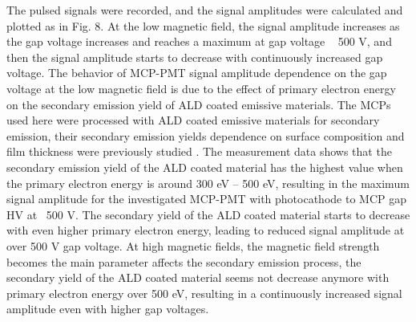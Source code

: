 \documentclass[preprint,5p]{elsarticle}
\begin{document}
The pulsed signals were recorded, and the signal amplitudes were calculated and 
plotted as in Fig. 8. At the low magnetic field, the signal amplitude increases 
as the gap voltage increases and reaches a maximum at gap voltage ~ 500 V, and 
then the signal amplitude starts to decrease with continuously increased gap 
voltage. The behavior of MCP-PMT signal amplitude dependence on the gap voltage 
at the low magnetic field is due to the effect of primary electron energy on 
the secondary emission yield of ALD coated emissive materials. The MCPs used 
here were processed with ALD coated emissive materials for secondary emission, 
their secondary emission yields dependence on surface composition and film 
thickness were previously studied \cite{22}. The measurement data shows that 
the secondary emission yield of the ALD coated material has the highest value 
when the primary electron energy is around 300 eV – 500 eV, resulting in the 
maximum signal amplitude for the investigated MCP-PMT with photocathode to MCP 
gap HV at ~500 V. The secondary yield of the ALD coated material starts to 
decrease with even higher primary electron energy, leading to reduced signal 
amplitude at over 500 V gap voltage. At high magnetic fields, the magnetic 
field strength becomes the main parameter affects the secondary emission 
process, the secondary yield of the ALD coated material seems not decrease 
anymore with primary electron energy over 500 eV, resulting in a continuously 
increased signal amplitude even with higher gap voltages.
\end{document}
